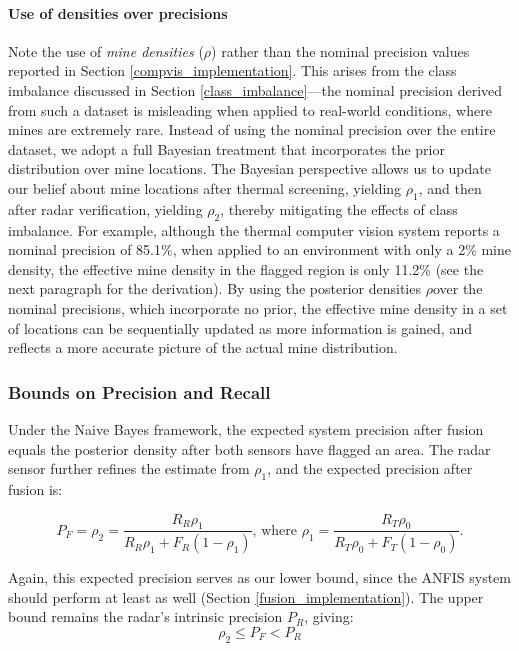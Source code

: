         \paragraph{Use of densities over precisions} 
        

            Note the use of \textit{mine densities} (\(\rho\)) rather than the nominal precision values reported in Section \ref{compvis_implementation}. This arises from the class imbalance discussed in Section \ref{class_imbalance}—the nominal precision derived from such a dataset is misleading when applied to real-world conditions, where mines are extremely rare. Instead of using the nominal precision over the entire dataset, we adopt a full Bayesian treatment that incorporates the prior distribution over mine locations. The Bayesian perspective allows us to update our belief about mine locations after thermal screening, yielding \(\rho_1\), and then after radar verification, yielding \(\rho_2\), thereby mitigating the effects of class imbalance. For example, although the thermal computer vision system reports a nominal precision of 85.1\%, when applied to an environment with only a 2\% mine density, the effective mine density in the flagged region is only 11.2\% (see the next paragraph for the derivation). By using the posterior densities \(\rho\)over the nominal precisions, which incorporate no prior, the effective mine density in a set of locations can be sequentially updated as more information is gained, and reflects a more accurate picture of the actual mine distribution.

        
    \subsubsection{Bounds on Precision and Recall}
    
        Under the Naive Bayes framework, the expected system precision after fusion equals the posterior density after both sensors have flagged an area. The radar sensor further refines the estimate from $\rho_1$, and the expected precision after fusion is:

        
        \[
        P_F = \rho_2 = \frac{R_R \rho_1}{R_R \rho_1 + F_R (1-\rho_1)} \text{, where }         \rho_1 = \frac{R_T \rho_0}{R_T \rho_0 + F_T (1-\rho_0)}.
        \]
        
        Again, this expected precision serves as our lower bound, since the ANFIS system should perform at least as well (Section \ref{fusion_implementation}). The upper bound remains the radar's intrinsic precision $P_R$, giving:
        \[
        \rho_2 \leq P_F < P_R
        \]
        
